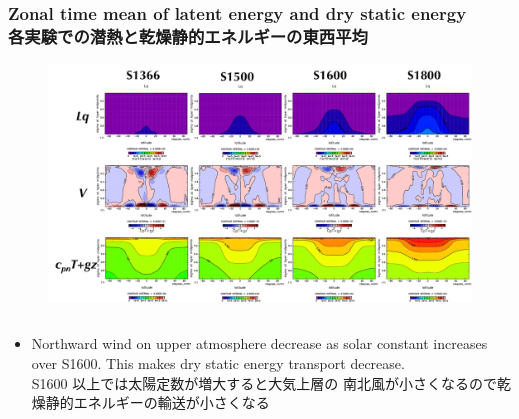 \documentclass[aspectratio=149,9pt,fleqn,tbtags]{beamer}
\newcommand{\jp}[1]{{\footnotesize #1}}
\begin{document}
\begin{frame}
	\frametitle{Zonal time mean of latent energy and dry static energy\\
	各実験での潜熱と乾燥静的エネルギーの東西平均}
	\begin{figure}
		\centering\footnotesize
		\includegraphics[width=.75\textwidth]{fig-cpt+gz.pdf}\\
	\end{figure}
	\begin{columns}[T]
		\begin{column}{\textwidth}
			\begin{itemize}
				\item Northward wind on upper atmosphere decrease as solar constant increases over S1600.
					This makes dry static energy transport decrease.\\
					\jp{S1600 以上では太陽定数が増大すると大気上層の
					南北風が小さくなるので乾燥静的エネルギーの輸送が小さくなる}
			\end{itemize}
		\end{column}
	\end{columns}
\end{frame}
\end{document}
